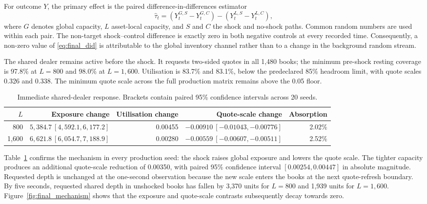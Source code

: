 For outcome $Y$, the primary effect is the paired difference-in-differences
estimator
\begin{equation}
\widehat{\tau}_{t}
=
\left(Y^{G,S}_{t}-Y^{G,C}_{t}\right)
-
\left(Y^{L,S}_{t}-Y^{L,C}_{t}\right),
\label{eq:final_did}
\end{equation}
where $G$ denotes global capacity, $L$ asset-local capacity, and $S$ and $C$
the shock and no-shock paths.  Common random numbers are used within each pair.
The non-target shock--control difference is exactly zero in both negative
controls at every recorded time.  Consequently, a non-zero value of
\eqref{eq:final_did} is attributable to the global inventory channel rather
than to a change in the background random stream.

The shared dealer remains active before the shock.  It requests two-sided
quotes in all 1,480 books; the minimum pre-shock resting coverage is 97.8\% at
$L=800$ and 98.0\% at $L=1{,}600$.  Utilisation is 83.7\% and 83.1\%, below the
predeclared 85\% headroom limit, with quote scales 0.326 and 0.338.  The minimum
quote scale across the full production matrix remains above the 0.05 floor.

\begin{table}[htbp]
\centering
\caption{Immediate shared-dealer response.  Brackets contain paired 95\%
confidence intervals across 20 seeds.}
\label{tab:final_mechanism}
\small
\begin{tabular}{rrrrr}
\toprule
$L$ & Exposure change & Utilisation change & Quote-scale change & Absorption \\
\midrule
800   & $5{,}384.7\ [4{,}592.1,6{,}177.2]$ & 0.00455
      & $-0.00910\ [-0.01043,-0.00776]$ & 2.02\% \\
1,600 & $6{,}621.8\ [6{,}054.7,7{,}188.9]$ & 0.00280
      & $-0.00559\ [-0.00607,-0.00511]$ & 2.52\% \\
\bottomrule
\end{tabular}
\end{table}

Table~\ref{tab:final_mechanism} confirms the mechanism in every production
seed: the shock raises global exposure and lowers the quote scale.  The tighter
capacity produces an additional quote-scale reduction of 0.00350, with paired
95\% confidence interval $[0.00254,0.00447]$ in absolute magnitude.  Requested
depth is unchanged at the one-second observation because the new scale enters
the books at the next quote-refresh boundary.  By five seconds, requested
shared depth in unshocked books has fallen by 3,370 units for $L=800$ and 1,939
units for $L=1{,}600$.  Figure~\ref{fig:final_mechanism} shows that the exposure
and quote-scale contrasts subsequently decay towards zero.


